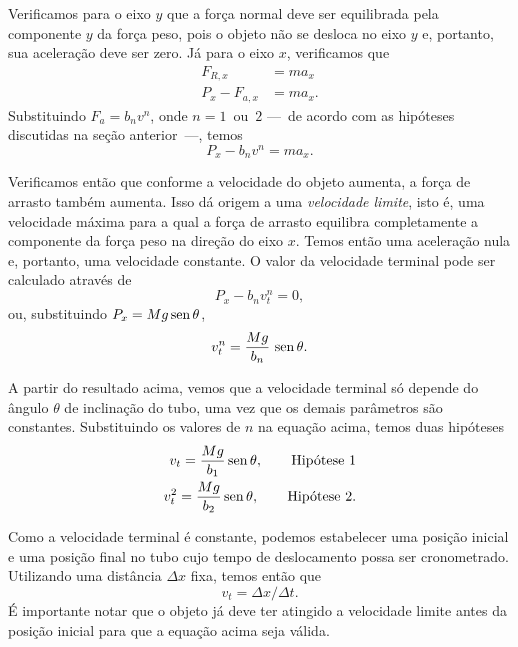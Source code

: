 Verificamos para o eixo $y$ que a força normal deve ser equilibrada pela componente $y$ da força peso, pois o objeto não se desloca no eixo $y$ e, portanto, sua aceleração deve ser zero. Já para o eixo $x$, verificamos que
\begin{align}
    F_{R,x} &= m a_x \\
	P_x - F_{a,x} &= ma_x.
\end{align}
%
Substituindo $F_a = b_n v^{n}$, onde $n=1$~ou~$2$ ---~de acordo com as hipóteses discutidas na seção anterior~---, temos
\begin{equation}
	P_x - b_n v^n = ma_x.
\end{equation}

Verificamos então que conforme a velocidade do objeto aumenta, a força de arrasto também aumenta. Isso dá origem a uma \emph{velocidade limite}, isto é, uma velocidade máxima para a qual a força de arrasto equilibra completamente a componente da força peso na direção do eixo $x$. Temos então uma aceleração nula e, portanto, uma velocidade constante. O valor da velocidade terminal pode ser calculado através de
\begin{equation}
	P_x - b_n v_t^n = 0,
\end{equation}
%
ou, substituindo $P_x = Mg\operatorname{sen}\theta$,
\begin{equation}
	v_t^n = \frac{Mg}{b_n}\,\operatorname{sen}\theta.
\end{equation}

A partir do resultado acima, vemos que a velocidade terminal só depende do ângulo $\theta$ de inclinação do tubo, uma vez que os demais parâmetros são constantes. Substituindo os valores de $n$ na equação acima, temos duas hipóteses
\begin{align}
	v_t =\frac{Mg}{b_1}\operatorname{sen}\theta, \qquad\textrm{Hipótese 1} \\
	v_t^2 =\frac{Mg}{b_2}\operatorname{sen}\theta, \qquad\textrm{Hipótese 2.}
\end{align}

Como a velocidade terminal é constante, podemos estabelecer uma posição inicial e uma posição final no tubo cujo tempo de deslocamento possa ser cronometrado. Utilizando uma distância $\Delta x$ fixa, temos então que
\begin{equation}
	v_t = \Delta x / \Delta t.
\end{equation}
%
É importante notar que o objeto já deve ter atingido a velocidade limite antes da posição inicial para que a equação acima seja válida.

